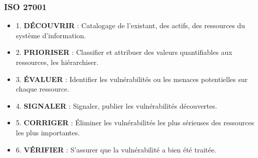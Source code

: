 \begin{frame}
\frametitle<presentation>{ISO 27001}
\begin{itemize}
	\item 1. \textbf{DÉCOUVRIR} : Catalogage de l’existant, des actifs, des ressources du système d’information. 
 	\item 2. \textbf{PRIORISER} : Classifier et attribuer des valeurs quantifiables aux ressources, les hiérarchiser. 
 	\item 3. \textbf{ÉVALUER} : Identifier les vulnérabilités ou les menaces potentielles sur chaque ressource. 
	 \item 4. \textbf{SIGNALER} : Signaler, publier les vulnérabilités découvertes. 
 	\item 5. \textbf{CORRIGER} : Éliminer les vulnérabilités les plus sérieuses des ressources les plus importantes. 
 	\item 6. \textbf{VÉRIFIER} : S’assurer que la vulnérabilité a bien été traitée. 
\end{itemize}

\end{frame}




	
